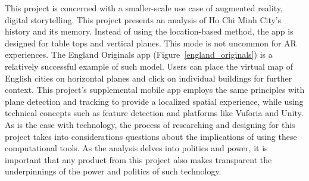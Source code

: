 \begin{figure}[!ht]
\end{figure}

\begin{figure}[!ht]
\end{figure}

This project is concerned with a smaller-scale use case of augmented reality, digital storytelling. This project presents an analysis of Ho Chi Minh City's history and its memory. Instead of using the location-based method, the app is designed for table tops and vertical planes. This mode is not uncommon for AR experiences. The England Originals app (Figure~\ref{england_originals}) is a relatively successful example of such model. Users can place the virtual map of English cities on horizontal planes and click on individual buildings for further context. This project's supplemental mobile app employs the same principles with plane detection and tracking to provide a localized spatial experience, while using technical concepts such as feature detection and platforms like Vuforia and Unity. As is the case with technology, the process of researching and designing for this project takes into considerations questions about the implications of using these computational tools. As the analysis delves into politics and power, it is important that any product from this project also makes transparent the underpinnings of the power and politics of such technology.
